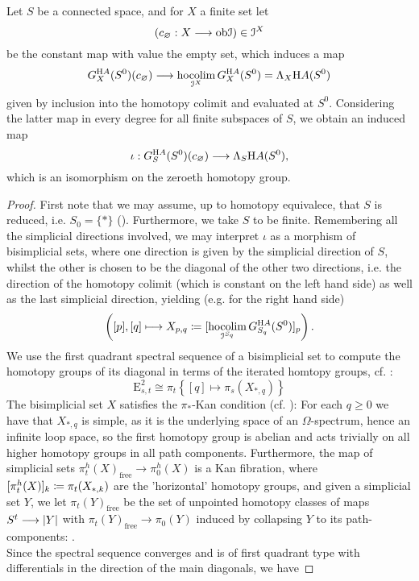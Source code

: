 \begin{lem}\label{lem_pi_0_loday_HA_A}
Let $S$ be a connected space, and for $X$ a finite set let
	\[(c_\varnothing: X \longrightarrow \mathrm{ob} \mathcal{I}) \in \mathcal{I}^X\]
be the constant map with value the empty set, which induces a map
\[
	G_X^{\H A}(S^0)(c_\varnothing) \to \hocolim_{\cI^X} G_X^{\H A}(S^0) = %
	\Lambda_X \H A (S^0)
\]
given by inclusion into the homotopy colimit and evaluated at $S^0$. Considering the latter map in every degree for all finite subspaces of $S$, we obtain an induced map
  \[	\iota: G^{\mathrm{H} A}_S (S^0) (c_\varnothing) \longrightarrow \Lambda_S \mathrm{H} A (S^0), \]
which is an isomorphism on the zeroeth homotopy group.
\begin{proof}
First note that we may assume, up to homotopy equivalece, that $S$ is reduced, i.e. $S_0 = \{\ast\}$ (). Furthermore, we take $S$ to be finite. Remembering all the simplicial directions involved, we may interpret $\iota$ as a morphism of bisimplicial sets, where one direction is given by the simplicial direction of $S$, whilst the other is chosen to be the diagonal of the other two directions, i.e. the direction of the homotopy colimit (which is constant on the left hand side) as well as the last simplicial direction, yielding (e.g. for the right hand side) %
	\[ \left( [p],[q] \longmapsto X_{p,q} \coloneqq [\operatorname*{hocolim}_{\mathcal{I}^{S_q}} G^{\mathrm{H} A}_{S_q} (S^0)]_p \right) . \]
We use the first quadrant spectral sequence of a bisimplicial set to compute the homotopy groups of its diagonal in terms of the iterated homtopy groups, cf. \cite[Thm. B5]{bousfield1978homotopy}:
	\[	\mathrm{E}^2_{s,t} %
	\cong \pi_t \left\{ [q] \mapsto \pi_s(X_{\ast,q}) \right\}	\]
The bisimplicial set $X$ satisfies the $\pi_*$-Kan condition (cf. \cite[B.3.1]{bousfield1978homotopy}): For each $q \geq 0$ we have that $X_{\ast, q}$ is simple, as it is the underlying space of an $\Omega$-spectrum, hence an infinite loop space, so the first homotopy group is abelian and acts trivially on all higher homotopy groups in all path components. Furthermore, the map of simplicial sets $\pi_t^h(X)_{\mathrm{free}} \to \pi_0^h (X)$ is a Kan fibration, where $[\pi_t^h(X)]_k \coloneqq \pi_t(X_{\ast,k})$ are the 'horizontal' homotopy groups, and given a simplicial set $Y$, we let $\pi_t (Y)_\mathrm{free}$ be the set of unpointed homotopy classes of maps $S^t \longrightarrow \left\vert Y\right\vert$ with $\pi_t(Y)_\mathrm{free} \to \pi_0(Y)$ induced by collapsing $Y$ to its path-components: .\\
Since the spectral sequence converges and is of first quadrant type with differentials in the direction of the main diagonals, we have

\end{proof}
\end{lem}
